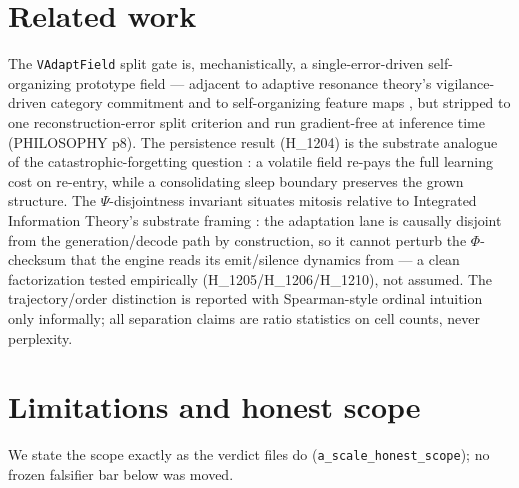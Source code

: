 \documentclass[11pt,a4paper]{article}
\begin{document}
\section{Related work}
\label{sec:related}

The \verb|VAdaptField| split gate is, mechanistically, a single-error-driven
self-organizing prototype field --- adjacent to adaptive resonance theory's
vigilance-driven category commitment \citep{rumelhart1985art} and to
self-organizing feature maps \citep{kohonen1982som}, but stripped to one
reconstruction-error split criterion and run gradient-free at inference time
(PHILOSOPHY p8). The persistence result (H\_1204) is the substrate analogue of
the catastrophic-forgetting question \citep{french1999catastrophic}: a volatile
field re-pays the full learning cost on re-entry, while a consolidating sleep
boundary preserves the grown structure. The $\Psi$-disjointness invariant
situates mitosis relative to Integrated Information Theory's substrate framing
\citep{albantakis2023iit4,tononi2016iit}: the adaptation lane is causally
disjoint from the generation/decode path by construction, so it cannot perturb
the $\Phi$-checksum that the engine reads its emit/silence dynamics from --- a
clean factorization tested empirically (H\_1205/H\_1206/H\_1210), not assumed.
The trajectory/order distinction is reported with Spearman-style ordinal
intuition \citep{borsook2009spearman} only informally; all separation claims are
ratio statistics on cell counts, never perplexity.

\section{Limitations and honest scope}
\label{sec:limitations}

We state the scope exactly as the verdict files do (\verb|a_scale_honest_scope|);
no frozen falsifier bar below was moved.
\end{document}
